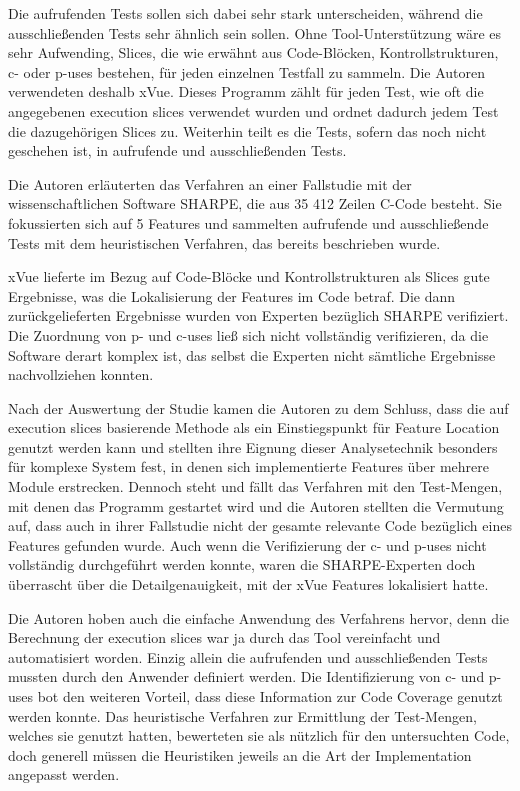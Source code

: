 \documentclass[runningheads,a4paper]{llncs}
\begin{document}
Die aufrufenden Tests sollen sich dabei sehr stark unterscheiden, während die ausschließenden Tests sehr ähnlich sein sollen. Ohne Tool-Unterstützung wäre es sehr Aufwending, Slices, die wie erwähnt aus Code-Blöcken, Kontrollstrukturen, c- oder p-uses bestehen, für jeden einzelnen Testfall zu sammeln. Die Autoren verwendeten deshalb xVue. Dieses Programm zählt für jeden Test, wie oft die angegebenen execution slices verwendet wurden und ordnet dadurch jedem Test die dazugehörigen Slices zu. Weiterhin teilt es die Tests, sofern das noch nicht geschehen ist, in aufrufende und ausschließenden Tests.

Die Autoren erläuterten das Verfahren an einer Fallstudie mit der wissenschaftlichen Software SHARPE, die aus 35 412 Zeilen C-Code besteht. Sie fokussierten sich auf 5 Features und sammelten aufrufende und ausschließende Tests mit dem heuristischen Verfahren, das bereits beschrieben wurde.

xVue lieferte im Bezug auf Code-Blöcke und Kontrollstrukturen als Slices gute Ergebnisse, was die Lokalisierung der Features im Code betraf. Die dann zurückgelieferten Ergebnisse wurden von Experten bezüglich SHARPE verifiziert. Die Zuordnung von p- und c-uses ließ sich nicht vollständig verifizieren, da die Software derart komplex ist, das selbst die Experten nicht sämtliche Ergebnisse nachvollziehen konnten.

Nach der Auswertung der Studie kamen die Autoren zu dem Schluss, dass die auf execution slices basierende Methode als ein Einstiegspunkt für Feature Location genutzt werden kann und stellten ihre Eignung dieser Analysetechnik besonders für komplexe System fest, in denen sich implementierte Features über mehrere Module erstrecken. Dennoch steht und fällt das Verfahren mit den Test-Mengen, mit denen das Programm gestartet wird und die Autoren stellten die Vermutung auf, dass auch in ihrer Fallstudie nicht der gesamte relevante Code bezüglich eines Features gefunden wurde. Auch wenn die Verifizierung der c- und p-uses nicht vollständig durchgeführt werden konnte, waren die SHARPE-Experten doch überrascht über die Detailgenauigkeit, mit der xVue Features lokalisiert hatte.

Die Autoren hoben auch die einfache Anwendung des Verfahrens hervor, denn die Berechnung der execution slices war ja durch das Tool vereinfacht und automatisiert worden. Einzig allein die aufrufenden und ausschließenden Tests mussten durch den Anwender definiert werden. Die Identifizierung von c- und p-uses bot den weiteren Vorteil, dass diese Information zur Code Coverage genutzt werden konnte. Das heuristische Verfahren zur Ermittlung der Test-Mengen, welches sie genutzt hatten, bewerteten sie als nützlich für den untersuchten Code, doch generell müssen die Heuristiken jeweils an die Art der Implementation angepasst werden.
\end{document}
